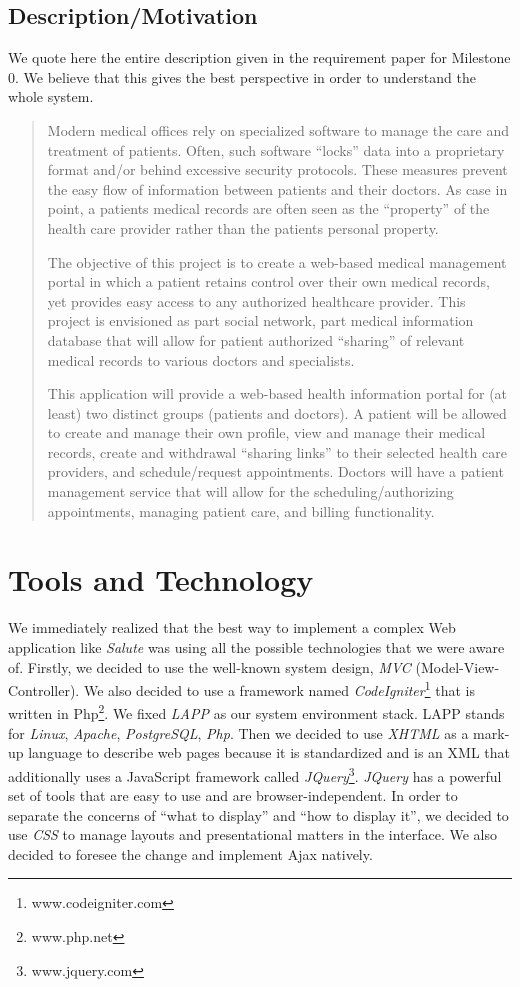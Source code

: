 \subsection{Description/Motivation}
We quote here the entire description given in the requirement paper for Milestone 0. We believe that this gives the best perspective in order to understand the whole system.
\begin{quotation}
   Modern medical offices rely on specialized software to manage the care and treatment of patients. Often,
such software “locks” data into a proprietary format and/or behind excessive security protocols. These
measures prevent the easy flow of information between patients and their doctors. As case in point, a
patients medical records are often seen as the “property” of the health care provider rather than the patients
personal property.
   
   The objective of this project is to create a web-based medical management portal in which a patient retains
control over their own medical records, yet provides easy access to any authorized healthcare provider. This
project is envisioned as part social network, part medical information database that will allow for patient
authorized “sharing” of relevant medical records to various doctors and specialists.
   
   This application will provide a web-based health information portal for (at least) two distinct groups
(patients and doctors). A patient will be allowed to create and manage their own profile, view and manage
their medical records, create and withdrawal “sharing links” to their selected health care providers, and
schedule/request appointments. Doctors will have a patient management service that will allow for the
scheduling/authorizing appointments, managing patient care, and billing functionality.
\end{quotation}


\section{Tools and Technology}
We immediately realized that the best way to implement a complex Web application like \emph{Salute} was using all the possible technologies that we were aware of. Firstly, we decided to use the well-known system design, \emph{MVC} (Model-View-Controller). We also decided to use a framework named \emph{CodeIgniter}\footnote{www.codeigniter.com} that is written in Php\footnote{www.php.net}. We fixed \emph{LAPP} as our system environment stack. LAPP stands for \emph{Linux}, \emph{Apache}, \emph{PostgreSQL}, \emph{Php}. Then we decided to use \emph{XHTML} as a mark-up language to describe web pages because it is standardized and is an XML that additionally uses a JavaScript framework called \emph{JQuery}\footnote{www.jquery.com}. \emph{JQuery} has a powerful set of tools that are easy to use and are browser-independent. In order to separate the concerns of ``what to display'' and ``how to display it'', we decided to use \emph{CSS} to manage layouts and presentational matters in the interface. We also decided to foresee the change and implement Ajax natively.

